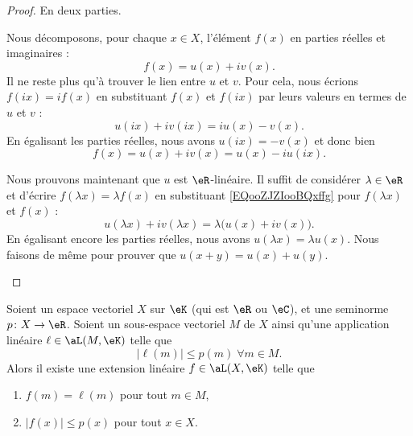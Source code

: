 \begin{proof}
	En deux parties.
	\begin{subproof}

		Nous décomposons, pour chaque \( x\in X\), l'élément \( f(x)\) en parties réelles et imaginaires :
		\begin{equation}		\label{EQooZJZIooBQxffg}
			f(x)=u(x)+iv(x).
		\end{equation}
		Il ne reste plus qu'à trouver le lien entre \( u\) et \( v\). Pour cela, nous écrions \( f(ix)=if(x)\) en substituant \( f(x)\) et \( f(ix)\) par leurs valeurs en termes de \( u\) et \( v\) :
		\begin{equation}
			u(ix)+iv(ix)=iu(x)-v(x).
		\end{equation}
		En égalisant les parties réelles, nous avons \( u(ix)=-v(x)\) et donc bien
		\begin{equation}	\label{EQooZUTLooVzwRDM}
			f(x)=u(x)+iv(x)=u(x)-iu(ix).
		\end{equation}

		Nous prouvons maintenant que \( u\) est \( \eR\)-linéaire. Il suffit de considérer \( \lambda\in\eR\) et d'écrire \( f(\lambda x)=\lambda f(x)\) en substituant \eqref{EQooZJZIooBQxffg} pour \( f(\lambda x)\) et \( f(x)\) :
		\begin{equation}
			u(\lambda x)+iv(\lambda x)=\lambda\big( u(x)+iv(x) \big).
		\end{equation}
		En égalisant encore les parties réelles, nous avons \( u(\lambda x)=\lambda u(x)\). Nous faisons de même pour prouver que \( u(x+y)=u(x)+u(y)\).


	\end{subproof}
\end{proof}

\begin{theorem}		\label{THOooVQLJooWuBMoZ}
	Soient un espace vectoriel \( X\) sur \( \eK\) (qui est \( \eR\) ou \( \eC\)), et une seminorme \(p \colon X\to \eR  \). Soient un sous-espace vectoriel \( M\) de \( X\) ainsi qu'une application linéaire \( \ell\in\aL(M,\eK)\) telle que
	\begin{equation}
		| \ell(m) |\leq p(m)\;\forall m\in M.
	\end{equation}
	Alors il existe une extension linéaire \( f\in\aL(X,\eK)\) telle que
	\begin{enumerate}
		\item
		      \( f(m)=\ell(m)\) pour tout \( m\in M\),
		\item
		      \( | f(x) |\leq p(x)\) pour tout \( x\in X\).
	\end{enumerate}
\end{theorem}

